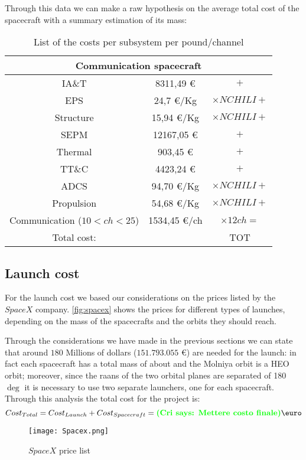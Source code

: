 	Through this data we can make a raw hypothesis on the average total cost of the spacecraft with a summary estimation 			of its mass:

	\begin{table}
		\centering
		\begin{tabular}{ccc}
		\toprule
		\multicolumn{3}{c}{Communication spacecraft}\\
		\midrule
		IA\&T       & 8311,49 \euro       & $+$\\
		EPS          & 24,7 \euro/Kg        & $\times NCHILI +$\\
		Structure   & 15,94  \euro/Kg     & $\times NCHILI +$\\
		SEPM        & 12167,05 \euro     & $+$\\
		Thermal    & 903,45 \euro        & $+$\\
		TT\&C       & 4423,24 \euro      & $+$\\
		ADCS        & 94,70 \euro/Kg     & $\times NCHILI +$\\
		Propulsion & 54,68   \euro/Kg   & $\times NCHILI +$\\
		Communication ($10 < ch < 25$) & 1534,45 \euro/ch & $\times 12 ch =$\\
		\bottomrule
		Total cost:& & TOT\\
		\end{tabular}
		\caption{List of the costs per subsystem per pound/channel}
		\label{tab:cost}
	\end{table}
\subsection{Launch cost}
For the launch cost we based our considerations on the prices listed by the $SpaceX$ company. \autoref{fig:spacex} shows the prices for different types of launches, depending on the mass of the spacecrafts and the orbits they should reach.

Through the considerations we have made in the previous sections we can state that around $180$ Millions of dollars ($151.793.055$ \euro {}) are needed for the launch: in fact each spacecraft has a total mass of about  and the Molniya orbit is a HEO orbit; moreover, since the raans of the two orbital planes are separated of 180 $\deg$ it is necessary to use two separate launchers, one for each spacecraft.\\

Through this analysis the total cost for the project is:
\begin{equation}
Cost_{Total} = Cost_{Launch} + Cost_{Spacecraft} = \cri{Mettere costo finale} \text{\euro}
\end{equation}

\begin{figure}
\centering
\texttt{[image: Spacex.png]}
\caption{$SpaceX$ price list}
\label{fig:spacex}
\end{figure}
